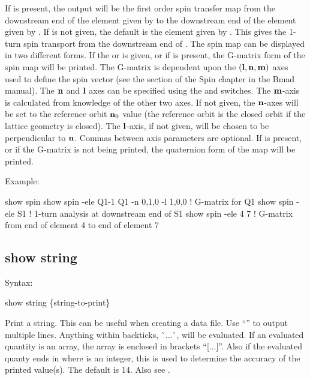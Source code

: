 {{{{{{{{{If  is present, the output will be the first order spin transfer map from the
downstream end of the element given by  to the downstream end of the element
given by .  If  is not given, the default is the element
given by . This gives the 1-turn spin transport from the downstream end of
. The spin map can be displayed in two different forms. If the 
or  is given, or if  is present, the G-matrix form of the spin map will be
printed.  The G-matrix is dependent upon the $({\bf l}, {\bf n}, {\bf m})$ axes used to define the spin
vector (see the  section of the Spin chapter in the Bmad manual). The ${\bf n}$ and
${\bf l}$ axes can be specified using the  and  switches. The ${\bf m}$-axis is
calculated from knowledge of the other two axes. If not given, the ${\bf n}$-axes will be set to the
reference orbit ${\bf n}_0$ value (the reference orbit is the closed orbit if the lattice geometry is
closed).  The ${\bf l}$-axis, if not given, will be chosen to be perpendicular to ${\bf n}$. Commas
between axis parameters are optional. If  is present, or if the G-matrix is not being
printed, the quaternion form of the map will be printed.


Example:
\begin{example}
  show spin
  show spin -ele Q1-1 Q1 -n 0,1,0 -l 1,0,0  ! G-matrix for Q1
  show spin -ele S1     ! 1-turn analysis at downstream end of S1 
  show spin -ele 4 7    ! G-matrix from end of element 4 to end of element 7
\end{example}


\subsection{show string}
\label{s:show.string}

Syntax:
\begin{example}
  show string \{string-to-print\}
\end{example}

Print a string. This can be useful when creating a data file. Use ``'' to output multiple
lines. Anything within backticks, \`{}...\`{}, will be evaluated. If an evaluated quantity is an
array, the array is enclosed in brackets ``[...]''. Also if the evaluated quanty ends in
 where  is an integer, this is used to determine the accuracy of the printed
value(s). The default is 14. Also see .

}}}}}}}}}
